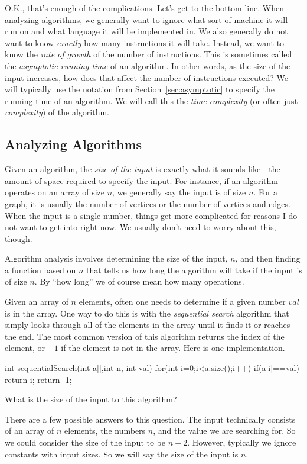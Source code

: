 O.K., that's enough of the complications.  Let's get to the bottom line.  When analyzing algorithms, we 
generally want to ignore what sort of machine it will run on and what language it will be implemented in.
We also generally do not want to know {\em exactly} how many instructions it will take.  
Instead, we want to know the {\em rate of growth} of the number of instructions.  
This is sometimes called the {\em asymptotic running time} of an algorithm.
In other words, as the size of the input increases, how does that affect the number of instructions executed?
We will typically use the notation from Section~\ref{sec:asymptotic} 
to specify the running time of an algorithm.
We will call this the {\em time complexity} (or often just {\em complexity})
of the algorithm.

\subsection{Analyzing Algorithms}

Given an algorithm, the {\em size of the input} is exactly what it sounds like---the amount of space
required to specify the input.  For instance, if an algorithm operates on an array of size $n$, 
we generally say the input is of size $n$.
For a graph, it is usually the number of vertices or the number of vertices and edges. 
When the input is a single number, things get more complicated for reasons I
do not want to get into right now.  We usually don't need to worry about this, though.

Algorithm analysis involves determining the size of the input, $n$,  and 
then finding a function based on $n$ that tells us how long the algorithm will take if the
input is of size $n$.  By ``how long'' we of course mean how many operations.

\begin{exa}
Given an array of $n$ elements, often one needs to determine if a given number $val$ is in the array.  
One way to do this is with the {\em sequential search} algorithm that simply looks through all of 
the elements in the array until it finds it or reaches the end.  The most common version of this
algorithm returns the index of the element, or $-1$ if the element is not in the array.
Here is one implementation.
\begin{code}
    int sequentialSearch(int a[],int n, int val) {
        for(int i=0;i<a.size();i++) {
            if(a[i]==val) {
                return i;
            }
        }
        return -1;
    }
\end{code}
What is the size of the input to this algorithm?
\begin{sol}
There are a few possible answers to this question.  The input technically consists of an array
of $n$ elements, the numbers $n$, and the value we are searching for.  So we could consider
the size of the input to be $n+2$.  However, typically we ignore constants with input sizes.
So we will say the size of the input is $n$.
\end{sol}
\end{exa}

